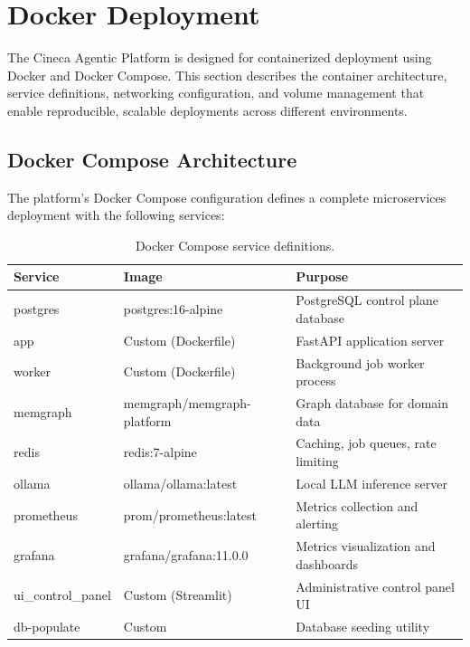 
\section{Docker Deployment}
\label{sec:docker-deployment}

The Cineca Agentic Platform is designed for containerized deployment using Docker and Docker Compose. This section describes the container architecture, service definitions, networking configuration, and volume management that enable reproducible, scalable deployments across different environments.

\subsection{Docker Compose Architecture}

The platform's Docker Compose configuration defines a complete microservices deployment with the following services:

\begin{table}[ht]
\centering
\caption{Docker Compose service definitions.}
\label{tab:docker-services}
\small
\begin{tabular}{llp{6.5cm}}
\hline
\textbf{Service} & \textbf{Image} & \textbf{Purpose} \\
\hline
postgres & postgres:16-alpine & PostgreSQL control plane database \\
app & Custom (Dockerfile) & FastAPI application server \\
worker & Custom (Dockerfile) & Background job worker process \\
memgraph & memgraph/memgraph-platform & Graph database for domain data \\
redis & redis:7-alpine & Caching, job queues, rate limiting \\
ollama & ollama/ollama:latest & Local LLM inference server \\
prometheus & prom/prometheus:latest & Metrics collection and alerting \\
grafana & grafana/grafana:11.0.0 & Metrics visualization and dashboards \\
ui\_control\_panel & Custom (Streamlit) & Administrative control panel UI \\
db-populate & Custom & Database seeding utility \\
\hline
\end{tabular}
\end{table}

